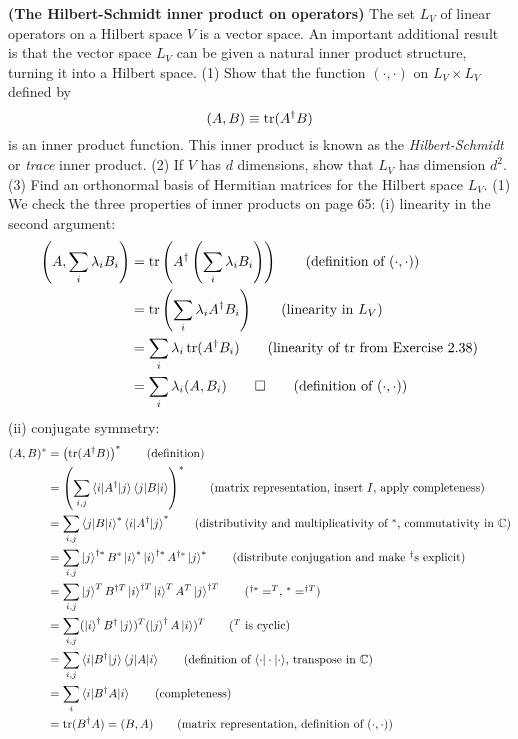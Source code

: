  \textbf{(The Hilbert-Schmidt inner product on operators)} The set $L_V$ of linear operators on a Hilbert space $V$ is a vector space.  An important additional result is that the vector space $L_V$ can be given a natural inner product structure, turning it into a Hilbert space.\newline
(1) Show that the function $(\cdot,\cdot)$ on $L_V\times L_V$ defined by $$(A, B) \equiv \operatorname{tr}(A^\dagger B)$$ is an inner product function.  This inner product is known as the \textit{Hilbert-Schmidt} or \textit{trace} inner product.\newline
(2) If $V$ has $d$ dimensions, show that $L_V$ has dimension $d^2$.\newline
(3) Find an orthonormal basis of Hermitian matrices for the Hilbert space $L_V$.
\Soln
(1) We check the three properties of inner products on page 65:\newline
\indent(i) linearity in the second argument:
\begin{align*}
\left(A, \sum_i \lambda_i B_i \right) &= \Tr \left(A^\dagger \left(\sum_i \lambda_i B_i  \right) \right) \tag{definition of $(\cdot,\cdot)$}\\
&= \Tr\left(\sum_i \lambda_i A^\dagger B_i\right) \tag{linearity in $L_V$} \\
&= \sum_i \lambda_i \Tr (A^\dagger B_i) \tag{linearity of $\Tr$ from Exercise 2.38} \\
&= \sum_i \lambda_i (A,B_i) \qed\tag{definition of $(\cdot, \cdot)$}
\end{align*}
\indent(ii) conjugate symmetry:
\begin{align*}
	(A, B)^* &= \left( \Tr (A^\dagger B) \right)^* \tag{definition}\\
		&= \left(\sum_{i,j} \braket{ i | A^\dagger | j} \braket{j | B | i}  \right)^* \tag{matrix representation, insert $I$, apply completeness}\\
		&= \sum_{i,j}  \braket{j | B | i}^* \braket{ i | A^\dagger | j}^*\tag{distributivity and multiplicativity of $^*$, commutativity in $\mathbb{C}$}\\
		&= \sum_{i,j}  \ket{j}^{\dagger*} B^* \ket{i}^* \ket{i}^{\dagger*} A^{\dagger*} \ket{j}^*\tag{distribute conjugation and make $^\dagger$s explicit}\\
		&= \sum_{i,j}   \ket{j}^{T} B^{\dagger T} \ket{i}^{\dagger T} \ket{i}^{T} A^{T} \ket{j}^{\dagger T} \tag{$^{\dagger*} = ^T$, $^*=^{\dagger T}$}\\
		&= \sum_{i,j}   (\ket{i}^{\dagger}B^{\dagger} \ket{j})^T (\ket{j}^{\dagger} A \ket{i})^T \tag{$^T$ is cyclic} \\
		&= \sum_{i,j}   \braket{i|B^{\dagger} |j} \braket{j | A | i} \tag{definition of $\braket{\cdot|\cdot|\cdot}$, transpose in $\mathbb{C}$} \\
		&= \sum_i \braket{i | B^\dagger A | i} \tag{completeness}\\
		&= \Tr (B^\dagger A) = (B, A) \tag{matrix representation, definition of $(\cdot, \cdot)$}\\
\end{align*}
